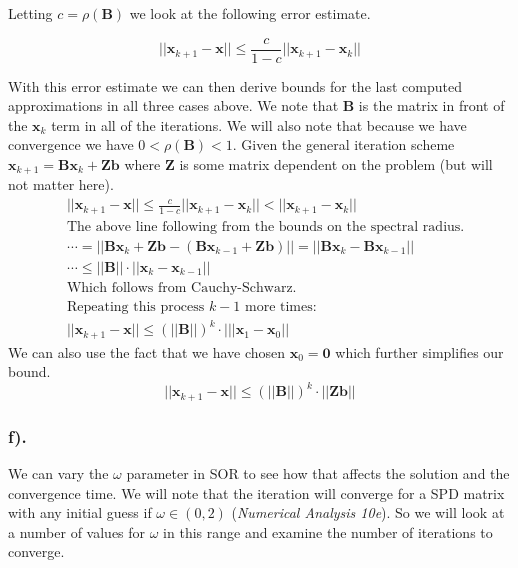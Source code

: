 \documentclass[11pt]{article}
\begin{document}
Letting \(c=\rho(\mathbf{B})\) we look at the following error estimate.

\[ ||\mathbf{x}_{k+1}-\mathbf{x}||\leq\frac{c}{1-c}||\mathbf{x}_{k+1}-\mathbf{x}_k|| \]

With this error estimate we can then derive bounds for the last computed
approximations in all three cases above. We note that \(\mathbf{B}\) is the matrix in front of the \(\mathbf{x}_k\) term in all of the iterations. We will also note that because we have convergence we have \(0< \rho(\mathbf{B}) < 1\). Given the general iteration scheme \(\mathbf{x}_{k+1} = \mathbf{Bx}_k + \mathbf{Zb}\) where \(\mathbf{Z}\) is some matrix dependent on the problem (but will not matter here).
\begin{align*}
	&||\mathbf{x}_{k+1}-\mathbf{x}||\leq\frac{c}{1-c}||\mathbf{x}_{k+1}-\mathbf{x}_k|| < ||\mathbf{x}_{k+1}-\mathbf{x}_k||\\
	&\text{The above line following from the bounds on the spectral radius.}\\
	&\cdots=||\mathbf{Bx}_k + \mathbf{Zb} - (\mathbf{Bx}_{k-1} + \mathbf{Zb})|| = ||\mathbf{Bx}_k - \mathbf{Bx}_{k-1}||\\
	&\cdots\leq||\mathbf{B}||\cdot||\mathbf{x}_k-\mathbf{x}_{k-1}||\\
	&\text{Which follows from Cauchy-Schwarz.}\\
	&\text{Repeating this process \(k-1\) more times:}\\
	&||\mathbf{x}_{k+1}-\mathbf{x}||\leq(||\mathbf{B}||)^{k}\cdot|||\mathbf{x}_1-\mathbf{x}_0||
\end{align*}
We can also use the fact that we have chosen \(\mathbf{x}_0=\mathbf{0}\) which further simplifies our bound.
\[\boxed{||\mathbf{x}_{k+1}-\mathbf{x}||\leq(||\mathbf{B}||)^{k}\cdot||\mathbf{Zb}||}\]


\vspace{0.5in}
    \hypertarget{f.}{%
\subsubsection*{f).}\label{f.}}

We can vary the \(\omega\) parameter in SOR to see how that affects the
solution and the convergence time. We will note that the iteration will
converge for a SPD matrix with any initial guess if \(\omega\in(0,2)\)
(\emph{Numerical Analysis 10e}). So we will look at a number of values
for \(\omega\) in this range and examine the number of iterations to
converge.
\end{document}
